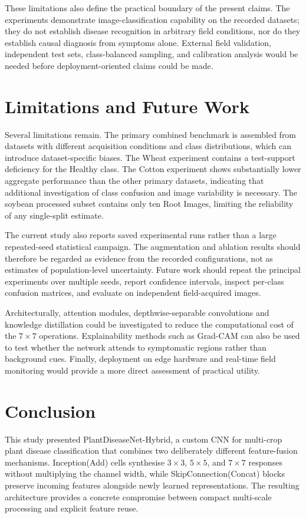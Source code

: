 \documentclass[a4paper,fleqn]{cas-dc}
\begin{document}
These limitations also define the practical boundary of the present claims. The experiments demonstrate image-classification capability on the recorded datasets; they do not establish disease recognition in arbitrary field conditions, nor do they establish causal diagnosis from symptoms alone. External field validation, independent test sets, class-balanced sampling, and calibration analysis would be needed before deployment-oriented claims could be made.

\section{Limitations and Future Work}
Several limitations remain. The primary combined benchmark is assembled from datasets with different acquisition conditions and class distributions, which can introduce dataset-specific biases. The Wheat experiment contains a test-support deficiency for the Healthy class. The Cotton experiment shows substantially lower aggregate performance than the other primary datasets, indicating that additional investigation of class confusion and image variability is necessary. The soybean processed subset contains only ten Root Images, limiting the reliability of any single-split estimate.

The current study also reports saved experimental runs rather than a large repeated-seed statistical campaign. The augmentation and ablation results should therefore be regarded as evidence from the recorded configurations, not as estimates of population-level uncertainty. Future work should repeat the principal experiments over multiple seeds, report confidence intervals, inspect per-class confusion matrices, and evaluate on independent field-acquired images.

Architecturally, attention modules, depthwise-separable convolutions and knowledge distillation could be investigated to reduce the computational cost of the $7\times7$ operations. Explainability methods such as Grad-CAM can also be used to test whether the network attends to symptomatic regions rather than background cues. Finally, deployment on edge hardware and real-time field monitoring would provide a more direct assessment of practical utility.

\section{Conclusion}
This study presented PlantDiseaseNet-Hybrid, a custom CNN for multi-crop plant disease classification that combines two deliberately different feature-fusion mechanisms. Inception(Add) cells synthesise $3\times3$, $5\times5$, and $7\times7$ responses without multiplying the channel width, while SkipConnection(Concat) blocks preserve incoming features alongside newly learned representations. The resulting architecture provides a concrete compromise between compact multi-scale processing and explicit feature reuse.
\end{document}
